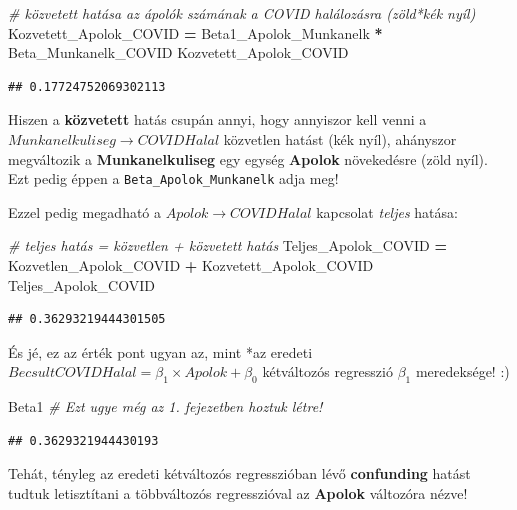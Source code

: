 \documentclass[
]{book}
\newenvironment{Shaded}{\begin{snugshade}}{\end{snugshade}}
\newcommand{\CommentTok}[1]{\textcolor[rgb]{0.56,0.35,0.01}{\textit{#1}}}
\newcommand{\NormalTok}[1]{#1}
\newcommand{\OperatorTok}[1]{\textcolor[rgb]{0.81,0.36,0.00}{\textbf{#1}}}
\begin{document}
\begin{Shaded}
\begin{Highlighting}[]
\CommentTok{\# közvetett hatása az ápolók számának a COVID halálozásra (zöld*kék nyíl)}
\NormalTok{Kozvetett\_Apolok\_COVID }\OperatorTok{=}\NormalTok{ Beta1\_Apolok\_Munkanelk }\OperatorTok{*}\NormalTok{ Beta\_Munkanelk\_COVID}
\NormalTok{Kozvetett\_Apolok\_COVID}
\end{Highlighting}
\end{Shaded}

\begin{verbatim}
## 0.17724752069302113
\end{verbatim}

Hiszen a \textbf{közvetett} hatás csupán annyi, hogy annyiszor kell venni a \(Munkanelkuliseg \rightarrow COVIDHalal\) közvetlen hatást (kék nyíl), ahányszor megváltozik a \textbf{Munkanelkuliseg} egy egység \textbf{Apolok} növekedésre (zöld nyíl). Ezt pedig éppen a \texttt{Beta\_Apolok\_Munkanelk} adja meg!

Ezzel pedig megadható a \(Apolok \rightarrow COVIDHalal\) kapcsolat \emph{teljes} hatása:

\begin{Shaded}
\begin{Highlighting}[]
\CommentTok{\# teljes hatás = közvetlen + közvetett hatás}
\NormalTok{Teljes\_Apolok\_COVID }\OperatorTok{=}\NormalTok{ Kozvetlen\_Apolok\_COVID }\OperatorTok{+}\NormalTok{ Kozvetett\_Apolok\_COVID}
\NormalTok{Teljes\_Apolok\_COVID}
\end{Highlighting}
\end{Shaded}

\begin{verbatim}
## 0.36293219444301505
\end{verbatim}

És jé, ez az érték pont ugyan az, mint *az eredeti \(BecsultCOVIDHalal = \beta_1 \times Apolok + \beta_0\) kétváltozós regresszió \(\beta_1\) meredeksége! :)

\begin{Shaded}
\begin{Highlighting}[]
\NormalTok{Beta1 }\CommentTok{\# Ezt ugye még az 1. fejezetben hoztuk létre!}
\end{Highlighting}
\end{Shaded}

\begin{verbatim}
## 0.3629321944430193
\end{verbatim}

Tehát, tényleg az eredeti kétváltozós regresszióban lévő \textbf{confunding} hatást tudtuk letisztítani a többváltozós regresszióval az \textbf{Apolok} változóra nézve!
\end{document}

